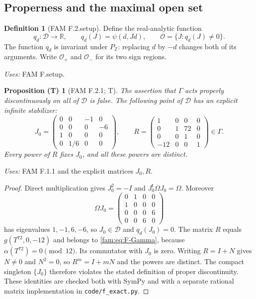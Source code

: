 \documentclass[11pt,a4paper]{article}
\theoremstyle{plain}
\newtheorem{proposition}[theorem]{Proposition (T)}
\theoremstyle{definition}
\newtheorem{definition}[theorem]{Definition}
\begin{document}
\subsection{Properness and the maximal open set}
\begin{definition}[FAM F.2.setup]\label{fam:F.2.setup}
Define the real-analytic function
\[
 q_d:\mathcal D\longrightarrow\mathbb R,\qquad q_d(J)=\psi(d,Jd),
 \qquad\mathcal O=\{J:q_d(J)\ne0\}.
\]
The function $q_d$ is invariant under $P_{\mathbb Z}$: replacing $d$ by
$-d$ changes both of its arguments.  Write $\mathcal O_+$ and
$\mathcal O_-$ for its two sign regions.
\end{definition}
\noindent\emph{Uses:} FAM F.setup.\par

\begin{proposition}[FAM F.2.1; T]\label{fam:F.2.1}
The assertion that $\Gamma$ acts properly discontinuously on all of
$\mathcal D$ is false.  The following point of $\mathcal D$ has an
explicit infinite stabilizer:
\[
 J_0=\begin{pmatrix}
 0&0&-1&0\\0&0&0&-6\\1&0&0&0\\0&1/6&0&0
 \end{pmatrix},\qquad
 R=\begin{pmatrix}
 1&0&0&0\\0&1&72&0\\0&0&1&0\\-12&0&0&1
 \end{pmatrix}\in\Gamma.
\]
Every power of $R$ fixes $J_0$, and all these powers are distinct.
\end{proposition}
\noindent\emph{Uses:} FAM F.1.1 and the explicit matrices $J_0,R$.\par

\begin{proof}
Direct multiplication gives $J_0^2=-I$ and
$J_0^{\mathsf t}\Omega J_0=\Omega$.  Moreover
\[
 \Omega J_0=\begin{pmatrix}
 0&1&0&0\\1&0&0&0\\0&0&0&6\\0&0&6&0
 \end{pmatrix}
\]
has eigenvalues $1,-1,6,-6$, so $J_0\in\mathcal D$ and $q_d(J_0)=0$.
The matrix $R$ equals $g(T^{72},0,-12)$ and belongs to \eqref{fam:eq:F-Gamma},
because $\alpha(T^{72})=0\pmod{12}$.  Its commutator with $J_0$ is zero.
Writing $R=I+N$ gives $N\ne0$ and $N^2=0$, so $R^m=I+mN$ and the
powers are distinct.  The compact singleton $\{J_0\}$ therefore violates
the stated definition of proper discontinuity.  These identities are
checked both with SymPy and with a separate rational matrix
implementation in \texttt{code/f\_exact.py}.
\end{proof}
\end{document}
